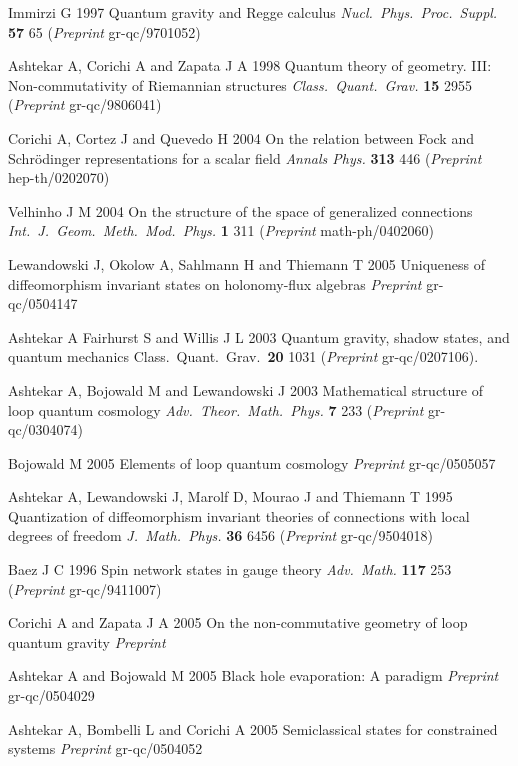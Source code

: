 \documentclass[aps,prd,tightenlines,showpacs,nofootinbib,preprint]{revtex4}
\begin{document}
\begin{thebibliography}{99}
 Immirzi G 1997 Quantum gravity and Regge calculus
{\it Nucl.\ Phys.\ Proc.\ Suppl.}  {\bf 57} 65
({\it Preprint} gr-qc/9701052)

Ashtekar A, Corichi A and Zapata J A 1998
Quantum theory of geometry. III: Non-commutativity of Riemannian
  structures {\it Class.\ Quant.\ Grav.}  {\bf 15} 2955
  ({\it Preprint} gr-qc/9806041)

 Corichi A, Cortez J and Quevedo H 2004 On the relation
 between Fock and Schr\"odinger representations for a  scalar field
 {\it Annals Phys.}  {\bf 313} 446  ({\it Preprint} hep-th/0202070)



  Velhinho J M 2004 On the structure of the space of generalized
  connections
  {\it Int.\ J.\ Geom.\ Meth.\ Mod.\ Phys.}  {\bf 1} 311
  ({\it Preprint} math-ph/0402060)

 Lewandowski J, Okolow A, Sahlmann H and Thiemann T
2005 Uniqueness of diffeomorphism invariant states on
holonomy-flux algebras
 {\it Preprint}  gr-qc/0504147

 Ashtekar A Fairhurst S and Willis J L 2003
 Quantum gravity, shadow states, and quantum mechanics
  Class.\ Quant.\ Grav.\  {\bf 20} 1031
  ({\it Preprint}  gr-qc/0207106).


 Ashtekar A, Bojowald M and Lewandowski J 2003
  Mathematical structure of loop quantum cosmology
  {\it Adv.\ Theor.\ Math.\ Phys.}  {\bf 7} 233
  ({\it Preprint} gr-qc/0304074)

 Bojowald M 2005
  Elements of loop quantum cosmology {\it Preprint}
  gr-qc/0505057


 Ashtekar A, Lewandowski J, Marolf D, Mourao J
and Thiemann T 1995 Quantization of diffeomorphism invariant theories
of connections with local degrees of freedom
  {\it J.\ Math.\ Phys.}  {\bf 36} 6456
  ({\it Preprint} gr-qc/9504018)

 Baez J C 1996 Spin network states in gauge theory
  {\it Adv.\ Math.}  {\bf 117} 253  ({\it Preprint} gr-qc/9411007)

 Corichi A and Zapata J A 2005  On the non-commutative
geometry of loop quantum gravity {\it Preprint}

 Ashtekar A and Bojowald M 2005 Black hole evaporation:
A paradigm {\it Preprint} gr-qc/0504029

 Ashtekar A, Bombelli L and Corichi A 2005
Semiclassical states for constrained systems {\it Preprint}
gr-qc/0504052

\end{thebibliography}
\end{document}
